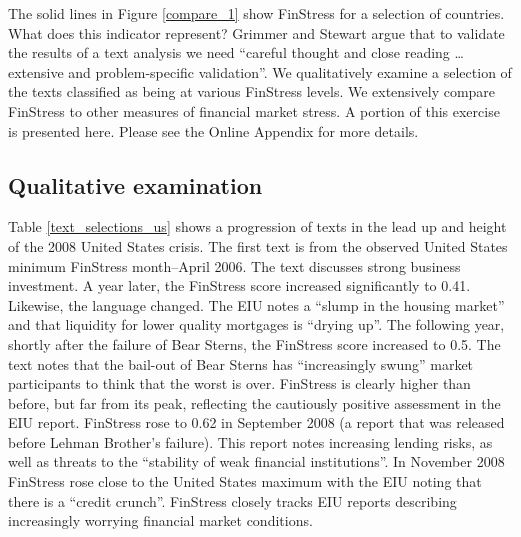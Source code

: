 \documentclass[]{article}
\begin{document}
The solid lines in Figure \ref{compare_1} show FinStress for a selection of countries. What does this indicator represent? Grimmer and Stewart \citeyearpar[267]{Grimmer2013} argue that to validate the results of a text analysis we need ``careful thought and close reading \ldots extensive and problem-specific validation''. We qualitatively examine a selection of the texts classified as being at various FinStress levels. We extensively compare FinStress to other measures of financial market stress. A portion of this exercise is presented here. Please see the Online Appendix for more details.



\subsection{Qualitative examination}

Table \ref{text_selections_us} shows a progression of texts in the lead up and height of the 2008 United States crisis. The first text is from the observed United States minimum FinStress month--April 2006. The text discusses strong business investment. A year later, the FinStress score increased significantly to 0.41. Likewise, the language changed. The EIU notes a ``slump in the housing market'' and that liquidity for lower quality mortgages is ``drying up''. The following year, shortly after the failure of Bear Sterns, the FinStress score increased to 0.5. The text notes that the bail-out of Bear Sterns has ``increasingly swung'' market participants to think that the worst is over. FinStress is clearly higher than before, but far from its peak, reflecting the cautiously positive assessment in the EIU report. FinStress rose to 0.62 in September 2008 (a report that was released before Lehman Brother's failure). This report notes increasing lending risks, as well as threats to the ``stability of weak financial institutions''. In November 2008 FinStress rose close to the United States maximum with the EIU noting that there is a ``credit crunch''. FinStress closely tracks EIU reports describing increasingly worrying financial market conditions.
\end{document}
